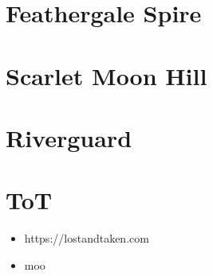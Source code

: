 \documentclass[12pt,twoside]{book}
\begin{document}
\section{Feathergale Spire}

\section{Scarlet Moon Hill}

\section{Riverguard}

\newpage

\section{ToT}
\begin{itemize}
	\item https://lostandtaken.com
	\item moo
\end{itemize}
\end{document}
